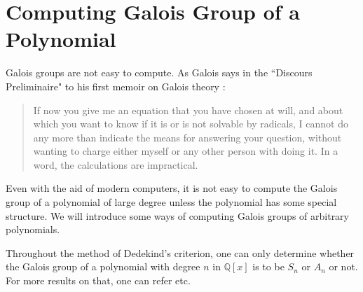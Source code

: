


\section{Computing Galois Group of a Polynomial}
Galois groups are not easy to compute. As Galois says in the ``Discours Preliminaire" to his first memoir on Galois theory \citep{cox2012galois}: 
\begin{quote}
If now you give me an equation that you have chosen at will, and about which you want to know if it is or is not solvable by radicals, I cannot do any more than indicate the means for answering your question, without wanting to charge either myself or any other person with doing it. In a word, the calculations are impractical. 
\end{quote}
Even with the aid of modern computers, it is not easy to compute the Galois group of a polynomial of large degree unless the polynomial has 
some special structure. We will introduce some ways of computing Galois groups of arbitrary polynomials.

Throughout the method of Dedekind's criterion, one can only determine whether the Galois group of a polynomial with degree $n$ in $\mathbb{Q}[x]$ is to be $S_n$ or $A_n$ or not. For more results on that, one can refer \citep{Conrad_recognizinggalois} etc.

